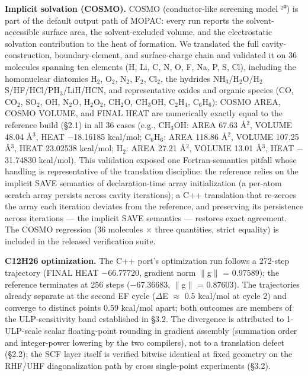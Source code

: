 \documentclass[preprint,12pt]{elsarticle}
\begin{document}
\textbf{Implicit solvation (COSMO).} COSMO (conductor-like screening model ²⁰) is part of the default output path of MOPAC: every run reports the solvent-accessible surface area, the solvent-excluded volume, and the electrostatic solvation contribution to the heat of formation. We translated the full cavity-construction, boundary-element, and surface-charge chain and validated it on 36 molecules spanning ten elements (H, Li, C, N, O, F, Na, P, S, Cl), including the homonuclear diatomics H$_{2}$, O$_{2}$, N$_{2}$, F$_{2}$, Cl$_{2}$, the hydrides NH$_{3}$/H$_{2}$O/H$_{2}$S/HF/HCl/PH$_{3}$/LiH/HCN, and representative oxides and organic species (CO, CO$_{2}$, SO$_{2}$, OH, N$_{2}$O, H$_{2}$O$_{2}$, CH$_{2}$O, CH$_{3}$OH, C$_{2}$H$_{4}$, C$_{6}$H$_{6}$): COSMO AREA, COSMO VOLUME, and FINAL HEAT are numerically exactly equal to the reference build (\S{}2.1) in all 36 cases (e.g., CH$_{3}$OH: AREA 67.63 \AA$^2$, VOLUME 48.04 \AA$^3$, HEAT $-$18.16185 kcal/mol; C$_{6}$H$_{6}$: AREA 118.86 \AA$^2$, VOLUME 107.25 \AA$^3$, HEAT 23.02538 kcal/mol; H$_{2}$: AREA 27.21 \AA$^2$, VOLUME 13.01 \AA$^3$, HEAT $-$31.74830 kcal/mol). This validation exposed one Fortran-semantics pitfall whose handling is representative of the translation discipline: the reference relies on the implicit SAVE semantics of declaration-time array initialization (a per-atom scratch array persists across cavity iterations); a C++ translation that re-zeroes the array each iteration deviates from the reference, and preserving its persistence across iterations --- the implicit SAVE semantics --- restores exact agreement. The COSMO regression (36 molecules $\times$ three quantities, strict equality) is included in the released verification suite.

\textbf{C12H26 optimization.} The C++ port's optimization run follows a 272-step trajectory (FINAL HEAT $-$66.77720, gradient norm $\|$g$\|$ = 0.97589); the reference terminates at 256 steps ($-$67.36683, $\|$g$\|$ = 0.87603). The trajectories already separate at the second EF cycle ($\Delta$E $\approx$ 0.5 kcal/mol at cycle 2) and converge to distinct points 0.59 kcal/mol apart; both outcomes are members of the ULP-sensitivity band established in \S{}3.2. The divergence is attributed to 1-ULP-scale scalar floating-point rounding in gradient assembly (summation order and integer-power lowering by the two compilers), not to a translation defect (\S{}2.2); the SCF layer itself is verified bitwise identical at fixed geometry on the RHF/UHF diagonalization path by cross single-point experiments (\S{}3.2).
\end{document}
